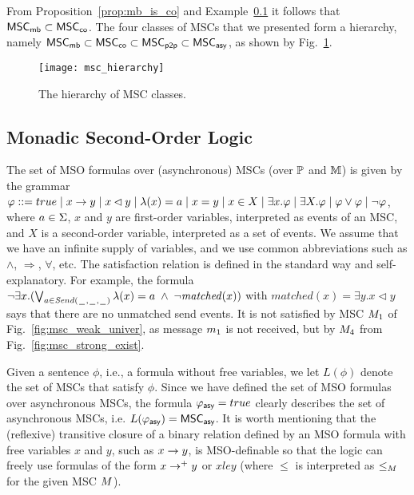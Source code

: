 \documentclass{article}
\begin{document}
From Proposition~\ref{prop:mb_is_co} and Example~\ref{} it follows that $\mathsf{MSC}_{\mathsf{mb}} \subset \mathsf{MSC}_{\mathsf{co}}$. The four classes of MSCs that we presented form a hierarchy, namely $\mathsf{MSC}_{\mathsf{mb}} \subset \mathsf{MSC}_{\mathsf{co}} \subset \mathsf{MSC}_{\mathsf{p2p}} \subset \mathsf{MSC}_{\mathsf{asy}}$, as shown by Fig.~\ref{fig:msc_hierarchy}.

\begin{figure}[h]
	\centering
	\texttt{[image: msc\_hierarchy]}
	\caption{The hierarchy of MSC classes.}
	\label{fig:msc_hierarchy}
\end{figure}

\subsection{Monadic Second-Order Logic}

The set of MSO formulas over (asynchronous) MSCs (over $\mathbb{P}$ and $\mathbb{M}$) is given by the grammar
$
\varphi ::= true \mid x \to y \mid x \lhd y \mid \lambda(x) = a \mid x = y \mid x \in X \mid \exists x.\varphi \mid \exists X.\varphi \mid \varphi \vee \varphi \mid \neg \varphi
$,
where $a \in \Sigma$, $x$ and $y$ are first-order variables, interpreted as
events of an MSC, and $X$ is a second-order variable, interpreted
as a set of events. We assume that we have an infinite supply of variables,
and we use common abbreviations such as $\wedge$, $\Rightarrow$, $\forall$, etc.
The satisfaction relation is defined in the standard way and self-explanatory.
For example, the formula $\neg\exists x.(\bigvee_{a \in {\mathit{Send}(\hspace{0.1em}\underline{\hspace{0.5em}}\hspace{0.1em},\hspace{0.1em}\underline{\hspace{0.5em}}\hspace{0.1em},\hspace{0.1em}\underline{\hspace{0.5em}}\hspace{0.1em})}} \lambda(x) = a \;\wedge\; \neg \mathit{matched}(x))$
with $\mathit{matched}(x) = \exists y.x \lhd y$
says that there are no unmatched send events.
It is not satisfied by  MSC $M_{1}$
of Fig.~\ref{fig:msc_weak_univer},
as message $m_1$ is not received,
but by $M_{4}$ from Fig.~\ref{fig:msc_strong_exist}.

Given a sentence $\phi$, i.e., a formula without free variables,
we let $L(\phi)$ denote the set of MSCs that satisfy $\phi$. Since we have defined the set of MSO formulas over asynchronous MSCs, the formula $\varphi_{\mathsf{asy}} = true$ clearly describes the set of asynchronous MSCs, i.e. $L(\varphi_{\mathsf{asy}}) = \mathsf{MSC}_{\mathsf{asy}}$. It is worth mentioning that the (reflexive) transitive closure of a binary relation defined by an MSO formula with free variables $x$ and $y$, such as $x \to y$, is MSO-definable so that the logic can freely use formulas of the form $x \to^+ y$ or $x le y$ (where $\le$ is interpreted as $\le_M$ for the given MSC $M$).
\end{document}
